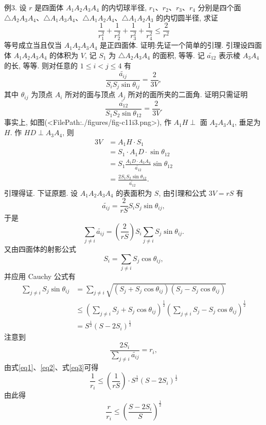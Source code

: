 例3. 设 $r$ 是四面体 $A_1 A_2 A_3 A_4$ 的内切球半径, $r_1 、 r_2 、 r_3 、 r_4$ 分别是四个面 $\triangle A_2 A_3 A_4 、 \triangle A_1 A_3 A_4 、 \triangle A_1 A_2 A_4 、 \triangle A_1 A_2 A_3$ 的内切圆半径, 求证
$$
\frac{1}{r_1^2}+\frac{1}{r_2^2}+\frac{1}{r_3^2}+\frac{1}{r_4^2} \leqslant \frac{2}{r^2}
$$
等号成立当且仅当 $A_1 A_2 A_3 A_4$ 是正四面体.
证明:先证一个简单的引理.
引理设四面体 $A_1 A_2 A_3 A_4$ 的体积为 $V$, 记 $S_1$ 为 $\triangle A_2 A_3 A_4$ 的面积, 等等.
记 $\widetilde{a_{12}}$ 表示棱 $A_3 A_4$ 的长, 等等.
则对任意的 $1 \leqslant i<j \leqslant 4$ 有
$$
\frac{\widetilde{a_{i j}}}{S_i S_j \sin \theta_{i j}}=\frac{2}{3 V},
$$
其中 $\theta_{i j}$ 为顶点 $A_i$ 所对的面与顶点 $A_j$ 所对的面所夹的二面角.
证明只需证明
$$
\frac{\widetilde{a_{12}}}{S_1 S_2 \sin \theta_{12}}=\frac{2}{3 V} .
$$
事实上, 如图(<FilePath:./figures/fig-c11i3.png>), 作 $A_1 H \perp$ 面 $A_2 A_3 A_4$, 垂足为 $H$. 作 $H D \perp A_3 A_4$, 则
$$
\begin{aligned}
3 V & =A_1 H \cdot S_1 \\
& =S_1 \cdot A_1 D \cdot \sin \theta_{12} \\
& =S_1 \frac{A_1 D \cdot A_3 A_4}{\widetilde{a_{12}}} \sin \theta_{12} \\
& =\frac{2 S_1 S_2 \sin \theta_{12}}{\widetilde{a_{12}}} .
\end{aligned}
$$
引理得证.
下证原题.
设 $A_1 A_2 A_3 A_4$ 的表面积为 $S$, 由引理和公式 $3 V=r S$ 有
$$
\widetilde{a_{i j}}=\frac{2}{r S} S_i S_j \sin \theta_{i j},
$$
于是
$$
\sum_{j \neq i} \widetilde{a_{i j}}=\left(\frac{2}{r S}\right) S_i \sum_{j \neq i} S_j \sin \theta_{i j} . \label{eq1}
$$
又由四面体的射影公式
$$
S_i=\sum_{j \neq i} S_j \cos \theta_{i j},
$$
并应用 Cauchy 公式有
$$
\begin{aligned}
\sum_{j \neq i} S_j \sin \theta_{i j} & =\sum_{j \neq i} \sqrt{\left(S_j+S_j \cos \theta_{i j}\right)\left(S_j-S_j \cos \theta_{i j}\right)} \\
& \leqslant\left(\sum_{j \neq i} S_j+S_j \cos \theta_{i j}\right)^{\frac{1}{2}}\left(\sum_{j \neq i} S_j-S_j \cos \theta_{i j}\right)^{\frac{1}{2}} \\
& =S^{\frac{1}{2}}\left(S-2 S_i\right)^{\frac{1}{2}}
\end{aligned} \label{eq2}
$$
注意到
$$
\frac{2 S_i}{\sum_{j \neq i} \widetilde{a_{i j}}}=r_i, \label{eq3}
$$
由式\ref{eq1}、\ref{eq2}、式\ref{eq3}可得
$$
\frac{1}{r_i} \leqslant\left(\frac{1}{r S}\right) \cdot S^{\frac{1}{2}}\left(S-2 S_i\right)^{\frac{1}{2}}
$$
由此得
$$
\frac{r}{r_i} \leqslant\left(\frac{S-2 S_i}{S}\right)^{\frac{1}{2}}
$$
